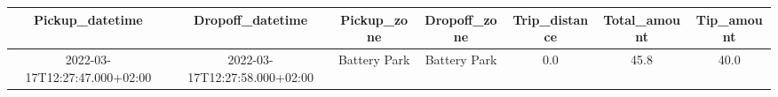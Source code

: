 \begin{tabular}{|c|c|c|c|c|c|c|}
\hline
Pickup\_datetime&Dropoff\_datetime&Pickup\_zone&Dropoff\_zone&Trip\_distance&Total\_amount&Tip\_amount \\ 
\hline
\hline
2022-03-17T12:27:47.000+02:00&2022-03-17T12:27:58.000+02:00&Battery Park&Battery Park&0.0&45.8&40.0 \\ 
\hline
\end{tabular}